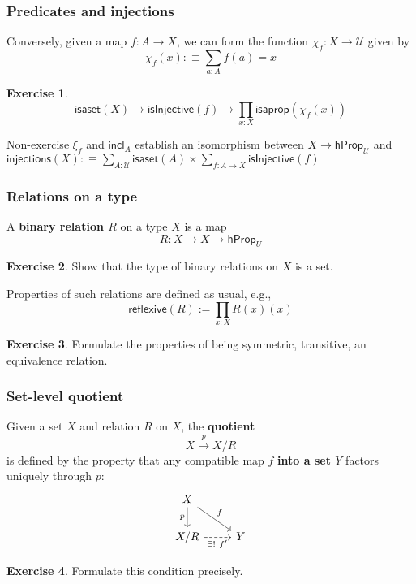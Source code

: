 \documentclass{beamer}
\newcommand{\fat}[1]{\textbf{#1}}
\newcommand{\constfont}[1]{\ensuremath{\mathsf{#1}}}
\newcommand{\U}{\mathcal{U}}
\newcommand{\hProp}{\constfont{hProp}}
\newcommand{\isaprop}{\constfont{isaprop}}
\newcommand{\isaset}{\constfont{isaset}}
\newcommand{\incl}{\constfont{incl}}
\newcommand{\isInjective}{\constfont{isInjective}}
\theoremstyle{definition}
\newtheorem{exercise}{Exercise}
\begin{document}
\begin{frame}
 \frametitle{Predicates and injections}

 Conversely, given a map $f:A\to{}X$, we can form the function $\chi_f:X\to\U$ given by
 \[
   \chi_f(x):\equiv\sum_{a:A} f(a)=x
 \]\pause

 \begin{exercise}
   \[
     \isaset(X)\to\isInjective(f)\to\prod_{x:X}\isaprop(\chi_f(x))
   \]
 \end{exercise}\pause
 \begin{block}{Non-exercise}
   $\xi_f$ and $\incl_A$ establish an isomorphism between $X\to\hProp_\U$ and
   $\constfont{injections}(X):\equiv\sum_{A:\U}\isaset(A)\times\sum_{f:A\to{}X}\isInjective(f)$
 \end{block}
\end{frame}

\begin{frame}
 \frametitle{Relations on a type}

  A \fat{binary relation $R$} on a type $X$ is a map
  \[ R : X \to X \to \hProp_U \]\pause

  \begin{exercise}
   Show that the type of binary relations on $X$ is a set.
  \end{exercise}\pause

  Properties of such relations are defined as usual, e.g.,
  \[ \constfont{reflexive}(R) := \prod_{x : X} R(x)(x) \]\pause

  \begin{exercise}
   Formulate the properties of being symmetric, transitive, an equivalence relation.
  \end{exercise}

\end{frame}

\begin{frame}
  \frametitle{Set-level quotient}
  Given a set $X$ and relation $R$ on $X$, the \fat{quotient}
  \[ X \xrightarrow{p} X/R \]
  is defined by the property that any compatible map $f$ \fat{into a set $Y$} factors uniquely through $p$:
  \[
    \begin{tikzcd}[ampersand replacement=\&]
      X\ar[d, "p"']\ar[rd, "f"] \& \\
      X/R \ar[r, "\exists !~ f'"', dashed] \& Y
    \end{tikzcd}
  \]
  \begin{exercise}
    Formulate this condition precisely. %
  \end{exercise}
\end{frame}
\end{document}
